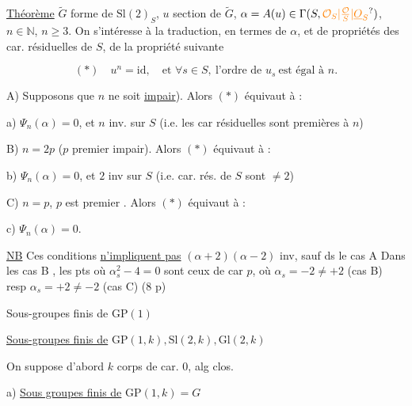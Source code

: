 \uline{Théorème} $\widetilde G$ forme de $\mathrm{Sl}(2)_S$, $u$ section de $\widetilde G$, $\alpha=A(u)\in\Gamma(S,\unsure{\mathcal O_S|\frac{\mathcal O}{S}|\underline{O}_S})$,
$n\in\mathbb N$, $\boxed{n\geq3}$. On s'intéresse à la traduction, en termes de $\alpha$,
et de propriétés des car. résiduelles de $S$, de la propriété
suivante


\[
(*)\quad u^n=\mathrm{id},\quad\text{et }\forall s\in S,\ \text{l'ordre de }u_s\ \text{est égal à }n.
\]

A) Supposons que $n$ ne soit  
  \uline{impair}). Alors $(*)$ équivaut à :

a) $\Psi_n(\alpha)=0$, et $n$ inv. sur $S$ (i.e. les car résiduelles
sont premières à $n$)


B) $n=2p$ ($p$ premier impair). Alors $(*)$ équivaut à :

b) $\Psi_n(\alpha)=0$, et $2$ inv sur $S$ (i.e. car. rés. de $S$
sont $\ne2$)


C) $n=p$, $p$ est premier . Alors $(*)$ équivaut à :

c) $\Psi_n(\alpha)=0$.

\uline{NB} Ces conditions \uline{n'impliquent pas} $(\alpha+2)(\alpha-2)$ inv, sauf ds le cas A
Dans les cas B  , les pts où $\alpha_s^2-4=0$ sont ceux de car $p$,
\deleted{(où $\alpha_s=-2\ne2$] (resp. ceux de car} où $\alpha_s=-2\ne+2$ (cas B) resp $\alpha_s=+2\ne-2$ (cas C)
(8 p)

Sous-groupes finis de
$\mathrm{GP}(1)$

\uline{Sous-groupes finis de} $\mathrm{GP}(1,k),\mathrm{Sl}(2,k),\mathrm{Gl}(2,k)$

On suppose d'abord $k$ corps de car. 0, alg clos.

a) \uline{Sous groupes finis de} $\mathrm{GP}(1,k)=G$

